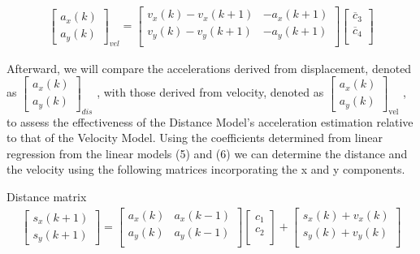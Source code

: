 \begin{align} \label{eq:lin_model_acc_vel}
    \begin{bmatrix}
        a_x(k) \\ 
        a_y(k) 
    \end{bmatrix}_{vel}
    =
    \begin{bmatrix}
        v_x(k) - v_x(k+1) & -a_x(k+1)    \\ 
        v_y(k) - v_y(k+1) & -a_y(k+1)    \\
    \end{bmatrix}
    \begin{bmatrix}
        \overline c_3 \\
        \overline c_4 \\
   \end{bmatrix}
\end{align}

Afterward, we will compare the accelerations derived from displacement, denoted as 
$\begin{bmatrix} a_x(k) \\ a_y(k) \end{bmatrix}_{dis}$
, with those derived from velocity, denoted as 
$\begin{bmatrix} a_x(k) \\ a_y(k) \end{bmatrix}_{\text{vel}}$
, to assess the effectiveness of the Distance Model's acceleration estimation relative to that of the Velocity Model.
Using the coefficients determined from linear regression from the linear models (5) and (6) we can determine the distance and the velocity using the following matrices incorporating the x and y components.

Distance matrix
{
\footnotesize
\label{eq:distance_matrix}
\begin{align}
    \begin{bmatrix}
        s_x(k+1) \\ 
        s_y(k+1) 
    \end{bmatrix}
    =
    \begin{bmatrix}
        a_x(k) & a_x(k-1)    \\ 
        a_y(k) & a_y(k-1)    \\
    \end{bmatrix}
    \begin{bmatrix}
        c_1 \\
        c_2 \\
    \end{bmatrix}
    +
    \begin{bmatrix}
        s_x(k) + v_x(k) \\ 
        s_y(k) + v_y(k) \\
    \end{bmatrix}
\end{align} 
}

